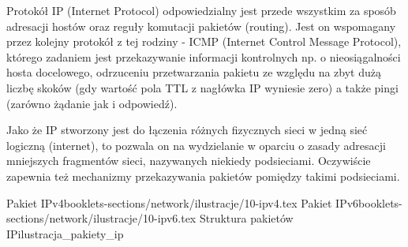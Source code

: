 Protokół IP (Internet Protocol) odpowiedzialny jest przede wszystkim za sposób adresacji hostów oraz reguły komutacji pakietów (routing). Jest on wspomagany przez kolejny protokół z tej rodziny - ICMP (Internet Control Message Protocol), którego zadaniem jest przekazywanie informacji kontrolnych np. o nieosiągalności hosta docelowego, odrzuceniu przetwarzania pakietu ze względu na zbyt dużą liczbę skoków (gdy wartość pola TTL z nagłówka IP wyniesie zero) a także pingi (zarówno żądanie jak i odpowiedź).

Jako że IP stworzony jest do łączenia różnych fizycznych sieci w jedną sieć logiczną (internet), to pozwala on na wydzielanie w oparciu o zasady adresacji mniejszych fragmentów sieci, nazywanych niekiedy podsieciami. Oczywiście zapewnia też mechanizmy przekazywania pakietów pomiędzy takimi podsieciami.

	{Pakiet IPv4}{booklets-sections/network/ilustracje/10-ipv4.tex}
	{Pakiet IPv6}{booklets-sections/network/ilustracje/10-ipv6.tex}
	{Struktura pakietów IP}{ilustracja_pakiety_ip}
